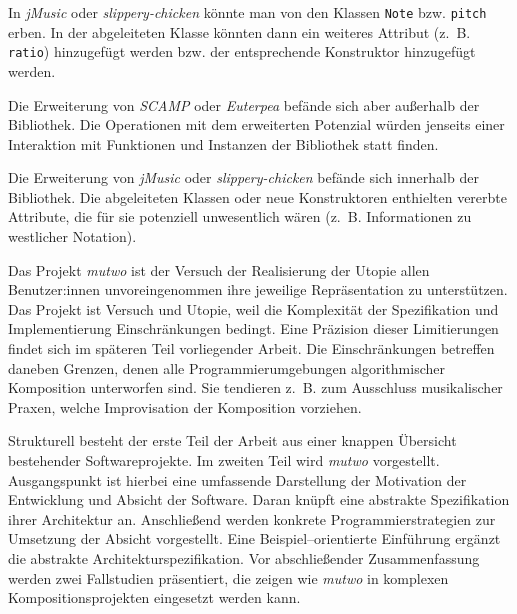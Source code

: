 \documentclass[12pt,a4paper,ngerman]{article}
\begin{document}
In \emph{jMusic} oder \emph{slippery-chicken} könnte man von den Klassen \texttt{Note} bzw. \texttt{pitch} erben.
In der abgeleiteten Klasse könnten dann ein weiteres Attribut (z.~B. \texttt{ratio}) hinzugefügt werden bzw. der entsprechende Konstruktor hinzugefügt werden.

\smallskip

Die Erweiterung von \emph{SCAMP} oder \emph{Euterpea} befände sich aber außerhalb der Bibliothek.
Die Operationen mit dem erweiterten Potenzial würden jenseits einer Interaktion mit Funktionen und Instanzen der Bibliothek statt finden.

\smallskip

Die Erweiterung von \emph{jMusic} oder \emph{slippery-chicken} befände sich innerhalb der Bibliothek.
Die abgeleiteten Klassen oder neue Konstruktoren enthielten vererbte Attribute, die für sie potenziell unwesentlich wären (z.~B. Informationen zu westlicher Notation).

\bigskip

Das Projekt \emph{mutwo} ist der Versuch der Realisierung der Utopie allen Benutzer:innen unvoreingenommen ihre jeweilige Repräsentation zu unterstützen.
Das Projekt ist Versuch und Utopie, weil die Komplexität der Spezifikation und Implementierung Einschränkungen bedingt.
Eine Präzision dieser Limitierungen findet sich im späteren Teil vorliegender Arbeit.
Die Einschränkungen betreffen daneben Grenzen, denen alle Programmierumgebungen algorithmischer Komposition unterworfen sind.
Sie tendieren z.~B. zum Ausschluss musikalischer Praxen, welche Improvisation der Komposition vorziehen.

\bigskip

Strukturell besteht der erste Teil der Arbeit aus einer knappen Übersicht bestehender Softwareprojekte.
Im zweiten Teil wird \emph{mutwo} vorgestellt.
Ausgangspunkt ist hierbei eine umfassende Darstellung der Motivation der Entwicklung und Absicht der Software.
Daran knüpft eine abstrakte Spezifikation ihrer Architektur an.
Anschließend werden konkrete Programmierstrategien zur Umsetzung der Absicht vorgestellt.
Eine Beispiel--orientierte Einführung ergänzt die abstrakte Architekturspezifikation.
Vor abschließender Zusammenfassung werden zwei Fallstudien präsentiert, die zeigen wie \emph{mutwo} in komplexen Kompositionsprojekten eingesetzt werden kann.

%
\end{document}
